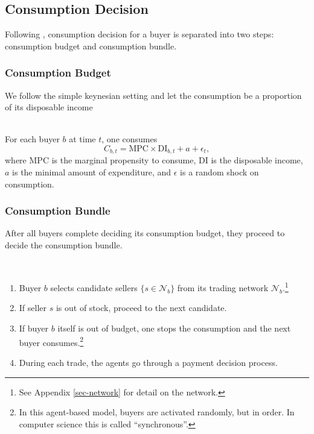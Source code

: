 
\subsection{Consumption Decision}

Following \citet*{HandbookABM}, consumption decision for a buyer is separated
into two steps: consumption budget and consumption bundle.

\subsubsection*{Consumption Budget}

We follow the simple keynesian setting and let the consumption be a proportion
of its disposable income

\begin{definition}
   {\phantom{text} \\}
   For each buyer $b$ at time $t$, one consumes
   \begin{equation}
      C_{b,t} = \mathrm{MPC}\times \mathrm{DI}_{b,t} + a + \epsilon_t ,
   \end{equation}
   where $\mathrm{MPC}$ is the marginal propensity to consume, $\mathrm{DI}$ is
   the disposable income, $a$ is the minimal amount of expenditure, and
   $\epsilon$ is a random shock on consumption.
\end{definition}

\subsubsection*{Consumption Bundle}
After all buyers complete deciding its consumption budget, they proceed to decide the consumption bundle.

\begin{definition}
\phantom{} \\
\begin{enumerate}
   \item Buyer $b$ selects candidate sellers $\{s \in \mathcal{N}_b\}$ from its
   trading network $\mathcal{N}_b$.\footnote{See Appendix \ref{sec-network} for detail on the
   network.}
   \item If seller $s$ is out of stock, proceed to the next candidate.
   \item If buyer $b$ itself is out of budget, one stops the consumption and the
   next buyer consumes.\footnote{In this agent-based model, buyers are activated
   randomly, but in order. In computer science this is called ``synchronous''.}
   \item During each trade, the agents go through a payment decision process.
\end{enumerate}
\end{definition}

